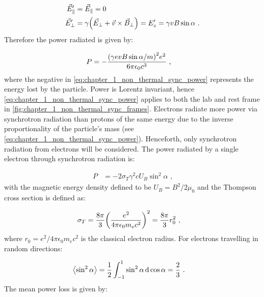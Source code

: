 \begin{subequations}
	\begin{align}
		\vec{E}_\parallel'&=\vec{E}_\parallel=0 \\
		\vec{E}_\perp'&=\gamma\qty(\vec{E}_\perp +\vec{v}\times \vec{B}_\perp) = E_z' = \gamma vB\sin\alpha\text{ .}
	\end{align}
\end{subequations}
\noindent Therefore the power radiated is given by:

\begin{equation}
    \begin{aligned}
	P&=-\frac{\qty(\gamma evB\sin\alpha/m)^2e^2}{6\pi\epsilon_0c^3}\text{ ,}
    \end{aligned} \label{eq:chapter_1_non_thermal_sync_power}
\end{equation}
\noindent where the negative in \autoref{eq:chapter_1_non_thermal_sync_power} represents the energy lost by the particle. Power is Lorentz invariant, hence \autoref{eq:chapter_1_non_thermal_sync_power} applies to both the lab and rest frame in \autoref{fig:chapter_1_non_thermal_sync_frames}. Electrons radiate more power via synchrotron radiation than protons of the same energy due to the inverse proportionality of the particle's mass (see \autoref{eq:chapter_1_non_thermal_sync_power}). Henceforth, only synchrotron radiation from electrons will be considered. The power radiated by a single electron through synchrotron radiation is:

\begin{equation}
    \begin{aligned}
    P&=-2\sigma_T\gamma^2c U_B\sin^2\alpha\text{ ,}
    \end{aligned}
\end{equation}
\noindent with the magnetic energy density defined to be $U_B=B^2/2\mu_0$ and the Thompson cross section is defined as:

\begin{equation}
    \begin{aligned}
    \sigma_T&=\frac{8\pi}{3}\qty(\frac{e^2}{4\pi\epsilon_0m_ec^2})^2=\frac{8\pi}{3}r_0^2\text{ ,}
    \end{aligned}
\end{equation}
\noindent where $r_0={e^2}/{4\pi\epsilon_0m_ec^2}$ is the classical electron radius. For electrons travelling in random directions:

\begin{equation}
    \begin{aligned}
        \left\langle \sin^2\alpha \right\rangle&=\frac{1}{2} \int_{-1}^1\sin^2\alpha\dd{\cos\alpha}=\frac{2}{3}\text{ .}
    \end{aligned}
\end{equation}
\noindent The mean power loss is given by:

